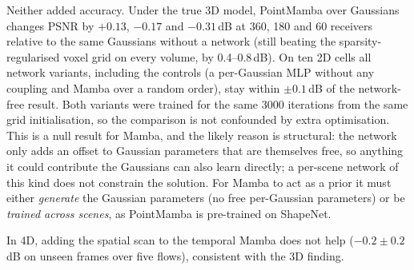 Neither added accuracy. Under the true 3D model, PointMamba over Gaussians changes PSNR by $+0.13$, $-0.17$ and
$-0.31$\,dB at 360, 180 and 60 receivers relative to the same Gaussians without a network (still beating the
sparsity-regularised voxel grid on every volume, by 0.4--0.8\,dB). On ten 2D cells all network variants, including the controls (a per-Gaussian
MLP without any coupling and Mamba over a random order), stay within $\pm0.1$\,dB of the network-free result.
Both variants were trained for the same 3000 iterations from the same grid initialisation, so the comparison is not
confounded by extra optimisation. This is a null result for Mamba, and the likely reason is structural: the network only adds an offset to Gaussian parameters that are themselves free, so anything it
could contribute the Gaussians can also learn directly; a per-scene network of this kind does not constrain the
solution. For Mamba to act as a prior it must either \emph{generate} the Gaussian parameters (no free per-Gaussian
parameters) or be \emph{trained across scenes}, as PointMamba is pre-trained on ShapeNet.

In 4D, adding the spatial scan to the temporal Mamba does not help ($-0.2\pm0.2$\,dB on unseen frames over five
flows), consistent with the 3D finding.

\begin{table}[h]
  \centering
  \caption{Further Mamba designs. Top: 3D/2D scattering, bounded grid-initialised Gaussians (B+G) with and without a
  PointMamba network (PSNR dB). Bottom: flow, 5 flows, 10\% observed, $\lambda_T=1$, PSNR on unseen frames (mean $\pm$ std).}
  \label{tab:mamba_more}
\end{table}

